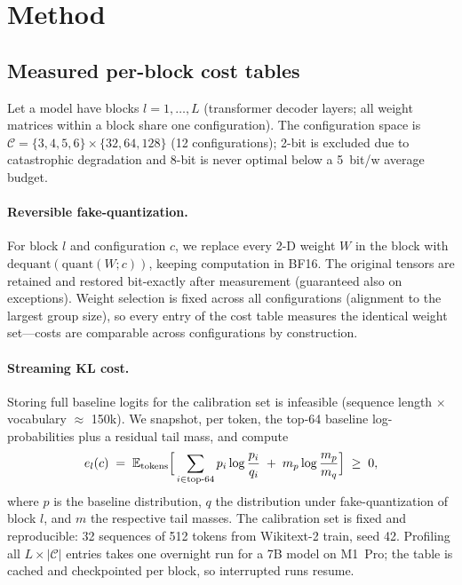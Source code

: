 \documentclass{article}
\begin{document}
\section{Method}

\subsection{Measured per-block cost tables}
\label{sec:profiler}

Let a model have blocks $l = 1,\dots,L$ (transformer decoder layers; all
weight matrices within a block share one configuration). The configuration
space is $\mathcal{C} = \{3,4,5,6\} \times \{32,64,128\}$ (12
configurations); 2-bit is excluded due to catastrophic degradation and
8-bit is never optimal below a 5~bit/w average budget.

\paragraph{Reversible fake-quantization.}
For block $l$ and configuration $c$, we replace every 2-D weight $W$ in the
block with $\mathrm{dequant}(\mathrm{quant}(W; c))$, keeping computation in
BF16. The original tensors are retained and restored bit-exactly after
measurement (guaranteed also on exceptions). Weight selection is fixed
across all configurations (alignment to the largest group size), so every
entry of the cost table measures the identical weight set---costs are
comparable across configurations by construction.

\paragraph{Streaming KL cost.}
Storing full baseline logits for the calibration set is infeasible
(sequence length $\times$ vocabulary $\approx$ 150k). We snapshot, per
token, the top-64 baseline log-probabilities plus a residual tail mass, and
compute
\begin{equation}
  e_l(c) \;=\; \mathbb{E}_{\text{tokens}}\Bigl[\,\sum_{i \in \text{top-64}}
  p_i \log\frac{p_i}{q_i} \;+\; m_p \log\frac{m_p}{m_q}\Bigr] \;\geq\; 0,
\end{equation}
where $p$ is the baseline distribution, $q$ the distribution under
fake-quantization of block $l$, and $m$ the respective tail masses. The
calibration set is fixed and reproducible: 32 sequences of 512 tokens from
Wikitext-2 train, seed 42. Profiling all $L \times |\mathcal{C}|$ entries
takes one overnight run for a 7B model on M1~Pro; the table is cached and
checkpointed per block, so interrupted runs resume.
\end{document}
